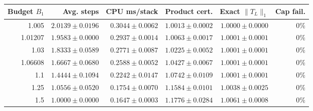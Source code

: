 \begin{center}
\small
\begin{tabular}{rrrrrr}
\toprule
Budget \(B_1\) & Avg. steps & CPU ms/stack & Product cert. & Exact \(\|T_L\|_1\) & Cap fail. \\
\midrule
1.005 & \(2.0139\pm 0.0196\) & \(0.3044\pm 0.0062\) & \(1.0013\pm 0.0002\) & \(1.0000\pm 0.0000\) & \(0\%\) \\
1.01207 & \(1.9583\pm 0.0000\) & \(0.2937\pm 0.0014\) & \(1.0063\pm 0.0017\) & \(1.0001\pm 0.0001\) & \(0\%\) \\
1.03 & \(1.8333\pm 0.0589\) & \(0.2771\pm 0.0087\) & \(1.0225\pm 0.0052\) & \(1.0001\pm 0.0001\) & \(0\%\) \\
1.06608 & \(1.6667\pm 0.0680\) & \(0.2588\pm 0.0052\) & \(1.0427\pm 0.0067\) & \(1.0001\pm 0.0001\) & \(0\%\) \\
1.1 & \(1.4444\pm 0.1094\) & \(0.2242\pm 0.0147\) & \(1.0742\pm 0.0109\) & \(1.0001\pm 0.0001\) & \(0\%\) \\
1.25 & \(1.0556\pm 0.0520\) & \(0.1754\pm 0.0070\) & \(1.1584\pm 0.0101\) & \(1.0038\pm 0.0025\) & \(0\%\) \\
1.5 & \(1.0000\pm 0.0000\) & \(0.1647\pm 0.0003\) & \(1.1776\pm 0.0284\) & \(1.0061\pm 0.0008\) & \(0\%\) \\
\bottomrule
\end{tabular}
\label{tab:budget-sensitivity}
\end{center}
